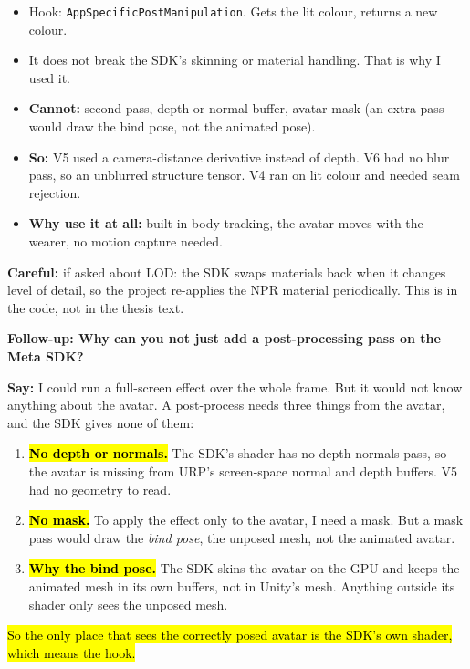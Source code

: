 \documentclass[11pt,a4paper]{article}
\newcommand{\key}[1]{\hl{#1}}
\newcommand{\say}[1]{\begin{tcolorbox}[colback=knlight,colframe=knblue,boxrule=0.5pt,left=6pt,right=6pt,top=4pt,bottom=4pt]\textbf{Say:} #1\end{tcolorbox}}
\newcommand{\careful}[1]{{\color{knred}\textbf{Careful:} #1}\par}
\begin{document}
\begin{itemize}
  \item Hook: \texttt{AppSpecificPostManipulation}. Gets the lit colour, returns a new colour.
  \item It does not break the SDK's skinning or material handling. That is why I used it.
  \item \textbf{Cannot:} second pass, depth or normal buffer, avatar mask (an extra pass would draw the bind pose, not the animated pose).
  \item \textbf{So:} V5 used a camera-distance derivative instead of depth. V6 had no blur pass, so an unblurred structure tensor. V4 ran on lit colour and needed seam rejection.
  \item \textbf{Why use it at all:} built-in body tracking, the avatar moves with the wearer, no motion capture needed.
\end{itemize}
\careful{if asked about LOD: the SDK swaps materials back when it changes level of detail, so the project re-applies the NPR material periodically. This is in the code, not in the thesis text.}

{\bfseries\color{knblue}Follow-up: Why can you not just add a post-processing pass on the Meta SDK?}\par\vspace{0.2em}

\say{I could run a full-screen effect over the whole frame. But it would not know anything about the avatar. A post-process needs three things from the avatar, and the SDK gives none of them:
\begin{enumerate}[leftmargin=1.4em,itemsep=0.1em,topsep=0.2em]
  \item \key{\textbf{No depth or normals.}} The SDK's shader has no depth-normals pass, so the avatar is missing from URP's screen-space normal and depth buffers. V5 had no geometry to read.
  \item \key{\textbf{No mask.}} To apply the effect only to the avatar, I need a mask. But a mask pass would draw the \emph{bind pose}, the unposed mesh, not the animated avatar.
  \item \key{\textbf{Why the bind pose.}} The SDK skins the avatar on the GPU and keeps the animated mesh in its own buffers, not in Unity's mesh. Anything outside its shader only sees the unposed mesh.
\end{enumerate}
\key{So the only place that sees the correctly posed avatar is the SDK's own shader, which means the hook.}}
\end{document}
